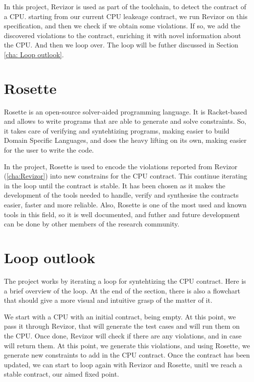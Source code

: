 In this project, Revizor is used as part of the toolchain, to detect the contract
of a CPU. starting from our current CPU leakeage contract, we run Revizor on this
specification, and then we check if we obtain some violations. If so, we add the
discovered violations to the contract, enriching it with novel information about
the CPU. And then we loop over. The loop will be futher discussed in Section \ref{cha:
Loop outlook}.

\section{Rosette}
\label{cha:Rosette} Rosette is an open-source solver-aided programming language.
It is Racket-based and allows to write programs that are able to generate and
solve constraints. So, it takes care of verifying and syntehtizing programs, making
easier to build Domain Specific Languages, and does the heavy lifting on its own,
making easier for the user to write the code.

In the project, Rosette is used to encode the violations reported from Revizor (\ref{cha:Revizor})
into new constrains for the CPU contract. This continue iterating in the loop until
the contract is stable. It has been chosen as it makes the development of the
tools needed to handle, verify and synthesise the contracts easier, faster and
more reliable. Also, Rosette is one of the most used and known tools in this
field, so it is well documented, and futher and future development can be done
by other members of the research community.

\section{Loop outlook}
\label{cha: Loop outlook} The project works by iterating a loop for syntehtizing
the CPU contract. Here is a brief overview of the loop. At the end of the
section, there is also a flowchart that should give a more visual and intuitive grasp
of the matter of it.

We start with a CPU with an initial contract, being empty. At this point, we
pass it through Revizor, that will generate the test cases and will run them on the
CPU. Once done, Revizor will check if there are any violations, and in case will
return them. At this point, we generate this violations, and using Rosette, we
generate new constraints to add in the CPU contract. Once the contract has been updated,
we can start to loop again with Revizor and Rosette, unitl we reach a stable contract,
our aimed fixed point.

